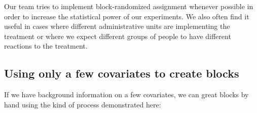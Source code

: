 \documentclass[
  12pt,
]{book}
\newenvironment{Shaded}{\begin{snugshade}}{\end{snugshade}}
\newcommand{\CommentTok}[1]{\textcolor[rgb]{0.56,0.35,0.01}{\textit{#1}}}
\newcommand{\DataTypeTok}[1]{\textcolor[rgb]{0.13,0.29,0.53}{#1}}
\newcommand{\DecValTok}[1]{\textcolor[rgb]{0.00,0.00,0.81}{#1}}
\newcommand{\KeywordTok}[1]{\textcolor[rgb]{0.13,0.29,0.53}{\textbf{#1}}}
\newcommand{\NormalTok}[1]{#1}
\newcommand{\OperatorTok}[1]{\textcolor[rgb]{0.81,0.36,0.00}{\textbf{#1}}}
\newcommand{\StringTok}[1]{\textcolor[rgb]{0.31,0.60,0.02}{#1}}
\theoremstyle{definition}
\theoremstyle{definition}
\theoremstyle{definition}
\theoremstyle{remark}
\begin{document}
\begin{Shaded}
\end{Shaded}

Our team tries to implement block-randomized assignment whenever
possible in order to increase the statistical power of our experiments.
We also often find it useful in cases where different administrative
units are implementing the treatment or where we expect different groups
of people to have different reactions to the treatment.

\hypertarget{using-only-a-few-covariates-to-create-blocks}{%
\subsection{Using only a few covariates to create
blocks}\label{using-only-a-few-covariates-to-create-blocks}}

If we have background information on a few covariates, we can great
blocks by hand using the kind of process demonstrated here:

\begin{Shaded}
\end{Shaded}
\end{document}

